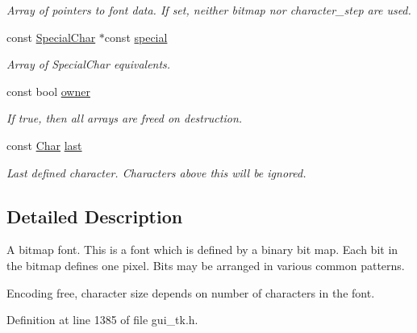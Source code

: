 \begin{DoxyCompactItemize}
\begin{DoxyCompactList}\small\item\em Array of pointers to font data. If set, neither {\itshape bitmap\/} nor {\itshape character\-\_\-step\/} are used. \end{DoxyCompactList}\item 
const \hyperlink{classGUI_1_1Font_af3c234cd3febe27dbe9c76e6cc5cad3a}{Special\-Char} $\ast$const \hyperlink{classGUI_1_1BitmapFont_a46f912c496e902dfc614e25261599718}{special}
\begin{DoxyCompactList}\small\item\em Array of Special\-Char equivalents. \end{DoxyCompactList}\item 
\hypertarget{classGUI_1_1BitmapFont_ac50042f33fedf2c8516294780ed6f128}{const bool \hyperlink{classGUI_1_1BitmapFont_ac50042f33fedf2c8516294780ed6f128}{owner}}\label{classGUI_1_1BitmapFont_ac50042f33fedf2c8516294780ed6f128}

\begin{DoxyCompactList}\small\item\em If {\ttfamily true}, then all arrays are freed on destruction. \end{DoxyCompactList}\item 
\hypertarget{classGUI_1_1BitmapFont_a3c992d29bbd0d35087365a8e5474686c}{const \hyperlink{namespaceGUI_af6b04b46d40197b4f00e553d7d1a3e4c}{Char} \hyperlink{classGUI_1_1BitmapFont_a3c992d29bbd0d35087365a8e5474686c}{last}}\label{classGUI_1_1BitmapFont_a3c992d29bbd0d35087365a8e5474686c}

\begin{DoxyCompactList}\small\item\em Last defined character. Characters above this will be ignored. \end{DoxyCompactList}\end{DoxyCompactItemize}


\subsection{Detailed Description}
A bitmap font. This is a font which is defined by a binary bit map. Each bit in the bitmap defines one pixel. Bits may be arranged in various common patterns. 

Encoding free, character size depends on number of characters in the font. 

Definition at line 1385 of file gui\-\_\-tk.\-h.



